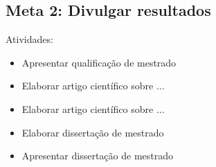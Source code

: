 \documentclass[12pt]{article}
\begin{document}
\subsection{Meta 2: Divulgar resultados}

Atividades:

\begin{itemize}
  \item Apresentar qualificação de mestrado
  \item Elaborar artigo científico sobre ...
  \item Elaborar artigo científico sobre ...
  \item Elaborar dissertação de mestrado
  \item Apresentar dissertação de mestrado
\end{itemize}


\end{document}
